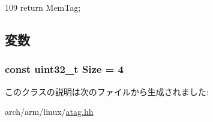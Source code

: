 \begin{DoxyCode}
109 { return MemTag; }
\end{DoxyCode}


\subsection{変数}
\hypertarget{classAtagMem_a7ecea14dd0f3277e19580d4509fafdba}{
\subsubsection[{Size}]{\setlength{\rightskip}{0pt plus 5cm}const {\bf uint32\_\-t} {\bf Size} = 4}}
\label{classAtagMem_a7ecea14dd0f3277e19580d4509fafdba}


このクラスの説明は次のファイルから生成されました:\begin{DoxyCompactItemize}
\item 
arch/arm/linux/\hyperlink{atag_8hh}{atag.hh}\end{DoxyCompactItemize}
